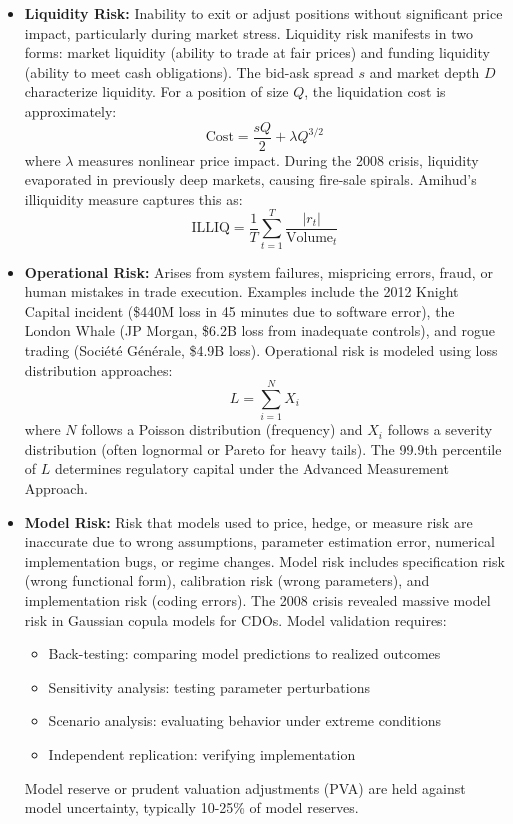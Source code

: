 \documentclass[11pt,a4paper]{article}
\begin{document}
\begin{itemize}
    \item \textbf{Liquidity Risk:} Inability to exit or adjust positions without significant price impact, particularly during market stress. Liquidity risk manifests in two forms: market liquidity (ability to trade at fair prices) and funding liquidity (ability to meet cash obligations). The bid-ask spread $s$ and market depth $D$ characterize liquidity. For a position of size $Q$, the liquidation cost is approximately:
    \[
    \text{Cost} = \frac{sQ}{2} + \lambda Q^{3/2}
    \]
    where $\lambda$ measures nonlinear price impact. During the 2008 crisis, liquidity evaporated in previously deep markets, causing fire-sale spirals. Amihud's illiquidity measure captures this as:
    \[
    \text{ILLIQ} = \frac{1}{T}\sum_{t=1}^T \frac{|r_t|}{\text{Volume}_t}
    \]
    
    \item \textbf{Operational Risk:} Arises from system failures, mispricing errors, fraud, or human mistakes in trade execution. Examples include the 2012 Knight Capital incident (\$440M loss in 45 minutes due to software error), the London Whale (JP Morgan, \$6.2B loss from inadequate controls), and rogue trading (Société Générale, \$4.9B loss). Operational risk is modeled using loss distribution approaches:
    \[
    L = \sum_{i=1}^N X_i
    \]
    where $N$ follows a Poisson distribution (frequency) and $X_i$ follows a severity distribution (often lognormal or Pareto for heavy tails). The 99.9th percentile of $L$ determines regulatory capital under the Advanced Measurement Approach.
    
    \item \textbf{Model Risk:} Risk that models used to price, hedge, or measure risk are inaccurate due to wrong assumptions, parameter estimation error, numerical implementation bugs, or regime changes. Model risk includes specification risk (wrong functional form), calibration risk (wrong parameters), and implementation risk (coding errors). The 2008 crisis revealed massive model risk in Gaussian copula models for CDOs. Model validation requires:
    \begin{itemize}
        \item Back-testing: comparing model predictions to realized outcomes
        \item Sensitivity analysis: testing parameter perturbations
        \item Scenario analysis: evaluating behavior under extreme conditions
        \item Independent replication: verifying implementation
    \end{itemize}
    Model reserve or prudent valuation adjustments (PVA) are held against model uncertainty, typically 10-25\% of model reserves.
    

\end{itemize}
\end{document}
